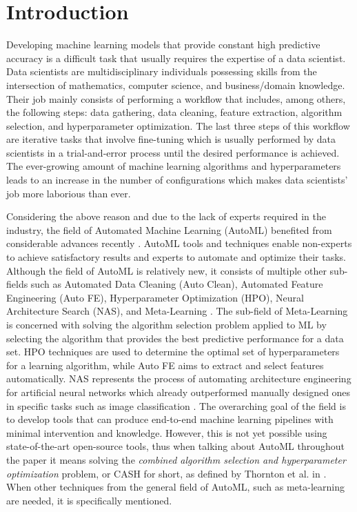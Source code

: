 \documentclass{sig-alternate-br}
\begin{document}
\section{Introduction}
Developing machine learning models that provide constant high predictive accuracy is a difficult task that usually requires the expertise of a data scientist. Data scientists are multidisciplinary individuals possessing skills from the intersection of mathematics, computer science, and business/domain knowledge. Their job mainly consists of performing a workflow that includes, among others, the following steps: data gathering, data cleaning, feature extraction, algorithm selection, and hyperparameter optimization. The last three steps of this workflow are iterative tasks that involve fine-tuning which is usually performed by data scientists in a trial-and-error process until the desired performance is achieved. The ever-growing amount of machine learning algorithms and hyperparameters leads to an increase in the number of configurations which makes data scientists' job more laborious than ever. 

Considering the above reason and due to the lack of experts required in the industry, the field of Automated Machine Learning (AutoML) benefited from considerable advances recently \cite{elshawi2019automated}. AutoML tools and techniques enable non-experts to achieve satisfactory results and experts to automate and optimize their tasks. Although the field of AutoML is relatively new, it consists of multiple other sub-fields such as Automated Data Cleaning (Auto Clean), Automated Feature Engineering (Auto FE), Hyperparameter Optimization (HPO), Neural Architecture Search (NAS), and Meta-Learning \cite{zoller2019survey}. The sub-field of Meta-Learning is concerned with solving the algorithm selection problem \cite{rice1976algorithm} applied to ML by selecting the algorithm that provides the best predictive performance for a data set. HPO techniques are used to determine the optimal set of hyperparameters for a learning algorithm, while Auto FE aims to extract and select features automatically. NAS represents the process of automating architecture engineering for artificial neural networks which already outperformed manually designed ones in specific tasks such as image classification \cite{elsken2018neural}. The overarching goal of the field is to develop tools that can produce end-to-end machine learning pipelines with minimal intervention and knowledge. However, this is not yet possible using state-of-the-art open-source tools, thus when talking about AutoML throughout the paper it means solving the \textit{combined algorithm selection and hyperparameter optimization} problem, or CASH for short, as defined by Thornton et al. in \cite{thornton2013autoweka}. When other techniques from the general field of AutoML, such as meta-learning are needed, it is specifically mentioned.
\end{document}

